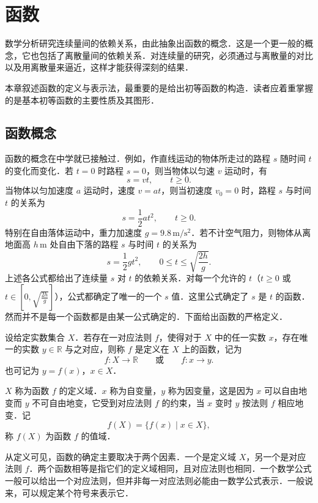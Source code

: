 \chapter{函\hspace{1.5em}数}\label{chap:02}

数学分析研究连续量间的依赖关系，由此抽象出函数的概念．这是一个更一般的概念，它也包括了离散量间的依赖关系．对连续量的研究，必须通过与离散量的对比以及用离散量来逼近，这样才能获得深刻的结果．

本章叙述函数的定义与表示法，最重要的是给出初等函数的构造．读者应着重掌握的是基本初等函数的主要性质及其图形．

\section{函数概念}\label{sec:2.1}

函数的概念在中学就已接触过．例如，作直线运动的物体所走过的路程 $s$ 随时间 $t$ 的变化而变化．若 $t=0$ 时路程 $s=0$，则当物体以匀速 $v$ 运动时，有
\[
s=vt,\qquad t\geqslant0.
\]
当物体以匀加速度 $a$ 运动时，速度 $v=at$，则当初速度 $v_0=0$ 时，路程 $s$ 与时间 $t$ 的关系为
\[
s=\frac{1}{2}at^2,\qquad t\geqslant0.
\]
特别在自由落体运动中，重力加速度 $g=9.8\,\mathrm{m/s^2}$．若不计空气阻力，则物体从离地面高 $h\,\mathrm{m}$ 处自由下落的路程 $s$ 与时间 $t$ 的关系为
\[
s=\frac{1}{2}gt^2,\qquad 0\leqslant t\leqslant\sqrt{\frac{2h}{g}}.
\]
上述各公式都给出了连续量 $s$ 对 $t$ 的依赖关系．对每一个允许的 $t$（$t\geqslant0$ 或 $t\in[0,\sqrt{\frac{2h}{g}}]$），公式都确定了唯一的一个 $s$ 值．这里公式确定了 $s$ 是 $t$ 的函数．然而并不是每一个函数都是由某一公式确定的．下面给出函数的严格定义．

\begin{definition}\label{def:2-1}
设给定实数集合 $X$．若存在一对应法则 $f$，使得对于 $X$ 中的任一实数 $x$，存在唯一的实数 $y\in\mathbb{R}$ 与之对应，则称 $f$ 是定义在 $X$ 上的函数，记为
\[
f\colon X\to\mathbb{R}\qquad \text{或}\qquad f\colon x\to y.
\]
也可记为 $y=f(x)$，$x\in X$．
\end{definition}

$X$ 称为函数 $f$ 的定义域．$x$ 称为自变量，$y$ 称为因变量，这是因为 $x$ 可以自由地变而 $y$ 不可自由地变，它受到对应法则 $f$ 的约束，当 $x$ 变时 $y$ 按法则 $f$ 相应地变．记
\[
f(X)=\{f(x)\mid x\in X\},
\]
称 $f(X)$ 为函数 $f$ 的值域．

从定义可见，函数的确定主要取决于两个因素．一个是定义域 $X$，另一个是对应法则 $f$．两个函数相等是指它们的定义域相同，且对应法则也相同．一个数学公式一般可以给出一个对应法则，但并非每一对应法则必能由一数学公式表示．一般说来，可以规定某个符号来表示它．

